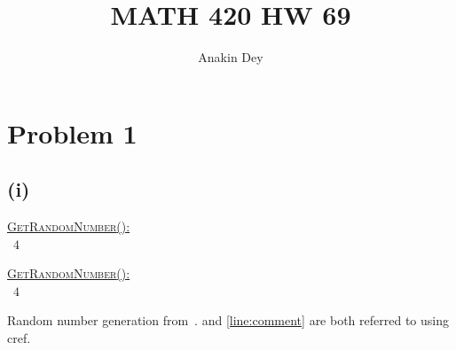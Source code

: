 \documentclass[letterpaper]{article}
\title{MATH 420 HW 69}
\author{Anakin Dey}
\begin{document}
\header

\section*{Problem 1}
\subsection*{(i)}

%

\begin{algo}[1.3]
    \underline{\textsc{GetRandomNumber}():}\+
\\      \return\ $4$   
\\      \hspace{39.00pt}
\end{algo}

\begin{nalgo}
                    \underline{\textsc{GetRandomNumber}():}\+
\\\label{line:ret}      \return\ $4$   
\\\label{line:comment}  \hspace{39.00pt}
\end{nalgo}

Random number generation from~\cite{site:xkcd}.  and \cref{line:comment} are both referred to using cref.
\end{document}
